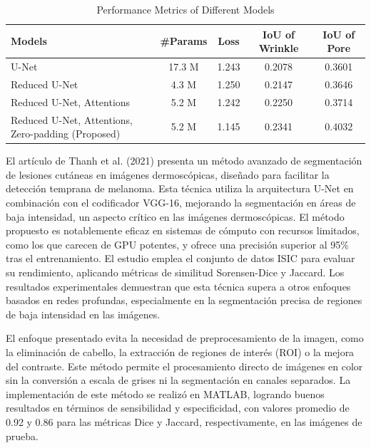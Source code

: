 \begin{table}[h]
    \centering
    \caption{Performance Metrics of Different Models}
    \begin{tabular}{@{}lcccc@{}}
        \toprule
        Models & \#Params & Loss & IoU of Wrinkle & IoU of Pore \\ \midrule
        U-Net & 17.3 M & 1.243 & 0.2078 & 0.3601 \\
        Reduced U-Net & 4.3 M & 1.250 & 0.2147 & 0.3646 \\
        Reduced U-Net, Attentions & 5.2 M & 1.242 & 0.2250 & 0.3714 \\
        Reduced U-Net, Attentions, Zero-padding (Proposed) & 5.2 M & 1.145 & 0.2341 & 0.4032 \\ \bottomrule
    \end{tabular}
    \label{tab:models_performance}
\end{table}



El artículo de Thanh et al. (2021) \cite{Thanh2021} presenta un método avanzado de segmentación de lesiones cutáneas en imágenes dermoscópicas, diseñado para facilitar la detección temprana de melanoma. Esta técnica utiliza la arquitectura U-Net en combinación con el codificador VGG-16, mejorando la segmentación en áreas de baja intensidad, un aspecto crítico en las imágenes dermoscópicas. El método propuesto es notablemente eficaz en sistemas de cómputo con recursos limitados, como los que carecen de GPU potentes, y ofrece una precisión superior al 95\% tras el entrenamiento. El estudio emplea el conjunto de datos ISIC para evaluar su rendimiento, aplicando métricas de similitud Sorensen-Dice y Jaccard. Los resultados experimentales demuestran que esta técnica supera a otros enfoques basados en redes profundas, especialmente en la segmentación precisa de regiones de baja intensidad en las imágenes.

El enfoque presentado evita la necesidad de preprocesamiento de la imagen, como la eliminación de cabello, la extracción de regiones de interés (ROI) o la mejora del contraste. Este método permite el procesamiento directo de imágenes en color sin la conversión a escala de grises ni la segmentación en canales separados. La implementación de este método se realizó en MATLAB, logrando buenos resultados en términos de sensibilidad y especificidad, con valores promedio de 0.92 y 0.86 para las métricas Dice y Jaccard, respectivamente, en las imágenes de prueba.


